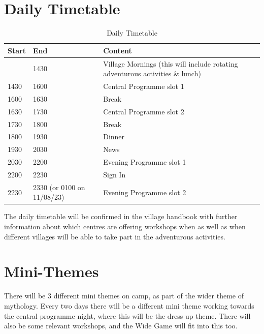 \documentclass[a4paper, 11pt]{report}
\begin{document}
\section{Daily Timetable}
\begin{table}[H]
    \label{tab:daily-timetable}
    \centering
    \begin{tabular}{p{} p{} p{}}
        \textbf{Start} & \textbf{End} & \textbf{Content}\\
        \hline
         & 1430 & Village Mornings (this will include rotating adventurous activities \& lunch) \\
        \hline
        1430 & 1600 & Central Programme slot 1 \\
        \hline
        1600 & 1630 & Break \\
        \hline
        1630 & 1730 & Central Programme slot 2 \\
        \hline
        1730 & 1800 & Break \\
        \hline
        1800 & 1930 & Dinner \\
        \hline
        1930 & 2030 & News \\
        \hline
        2030 & 2200 & Evening Programme slot 1 \\
        \hline
        2200 & 2230 & Sign In \\
        \hline
        2230 & 2330 (or 0100 on 11/08/23) & Evening Programme slot 2 \\
        \hline
    \end{tabular}
    \caption{Daily Timetable}
\end{table}
The daily timetable will be confirmed in the village handbook with further information about which centres are offering workshops when as well as when different villages will be able to take part in the adventurous activities. 

\section{Mini-Themes}
There will be 3 different mini themes on camp, as part of the wider theme of mythology. Every two days there will be a different mini theme working towards the central programme night, where this will be the dress up theme. There will also be some relevant workshops, and the Wide Game will fit into this too.
\end{document}
